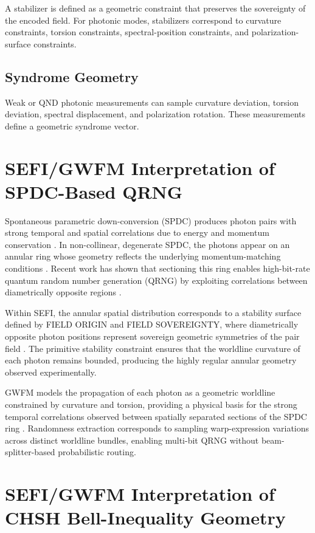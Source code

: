 \documentclass[aip, reprint, superscriptaddress]{revtex4-2}
\begin{document}
A stabilizer is defined as a geometric constraint that preserves the sovereignty of the 
encoded field. For photonic modes, stabilizers correspond to curvature constraints, 
torsion constraints, spectral-position constraints, and polarization-surface constraints.

\subsection{Syndrome Geometry}

Weak or QND photonic measurements can sample curvature deviation, torsion deviation, 
spectral displacement, and polarization rotation. These measurements define a 
geometric syndrome vector.

\section{SEFI/GWFM Interpretation of SPDC-Based QRNG}

Spontaneous parametric down-conversion (SPDC) produces photon pairs with strong 
temporal and spatial correlations due to energy and momentum conservation 
\cite{HongMandel, Uren2005}. In non-collinear, degenerate SPDC, the photons appear 
on an annular ring whose geometry reflects the underlying momentum-matching 
conditions \cite{Jabir2017}. Recent work has shown that sectioning this ring enables 
high-bit-rate quantum random number generation (QRNG) by exploiting correlations 
between diametrically opposite regions \cite{SPDCQRNG2023}.

Within SEFI, the annular spatial distribution corresponds to a stability surface defined 
by FIELD ORIGIN and FIELD SOVEREIGNTY, where diametrically opposite photon 
positions represent sovereign geometric symmetries of the pair field \cite{DuttonSEFI}. 
The primitive stability constraint ensures that the worldline curvature of each photon 
remains bounded, producing the highly regular annular geometry observed 
experimentally.

GWFM models the propagation of each photon as a geometric worldline constrained by 
curvature and torsion, providing a physical basis for the strong temporal correlations 
observed between spatially separated sections of the SPDC ring \cite{DuttonGWFM}. 
Randomness extraction corresponds to sampling warp-expression variations across 
distinct worldline bundles, enabling multi-bit QRNG without beam-splitter-based 
probabilistic routing.

\section{SEFI/GWFM Interpretation of CHSH Bell-Inequality Geometry}
\end{document}
